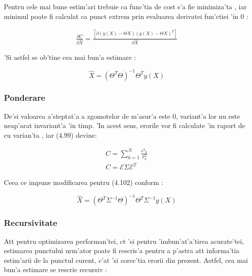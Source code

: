 \documentclass[12pt,a4paper,twoside]{report}
\begin{document}
\vspace{5px}

Pentru cele mai bune estim'ari trebuie ca func'tia de cost s'a fie minimiza'ta \cite{LinReg}, iar minimul poate fi calculat ca punct extrem prin evaluarea derivatei fun'ctiei 'in $0$ \cite{LeastSquares}:


\begin{gather}
    \frac{\partial C}{\partial \hat X} = \frac{[\partial (y(X) - \Theta X) (y(X) - \Theta X)^T]}{\partial \hat X}
\end{gather}

'Si astfel se ob'tine cea mai bun'a estimare \cite{LeastSquares} \cite{LinReg} \cite{doi:https://doi.org/10.1002/0470013192.bsa199}:

\begin{equation}
    \hat X = (\Theta^T \Theta)^{-1} \Theta ^T y(X)
\end{equation}

\subsubsection{Ponderare}

De'si valoarea a'steptat'a a zgomotelor de m'asur'a este 0, variant'a lor nu este neap'arat invariant'a 'in timp. 'In acest sens, erorile vor fi calculate 'in raport de cu varian'ta \cite{weightls}, iar (4.99) devine:

\begin{gather}
    C = \sum_{k=1}^{N} \frac{{\epsilon^2}_k}{\sigma^2_k} \\
    C = \mathcal{E} \Sigma \mathcal{E}^T
\end{gather}

Ceea ce impune modificarea pentru (4.102) conform \cite{weightls}:

\begin{equation}
    \hat X = (\Theta^T \Sigma^{-1} \Theta)^{-1} \Theta^T \Sigma^{-1} y(X)
\end{equation}


\subsubsection{Recursivitate}

At\ia t pentru optimizarea performan'tei, c\ia t 'si pentru 'imbun'at'a'tirea acurate'tei, estimarea punctului urm'ator poate fi rescris'a pentru a p'astra at\ia t informa'tia estim'arii de la punctul curent, c'at 'si corec'tia erorii din prezent. Astfel, cea mai bun'a estimare se rescrie recursiv \cite{10.1115/1.3662552}:
\end{document}
